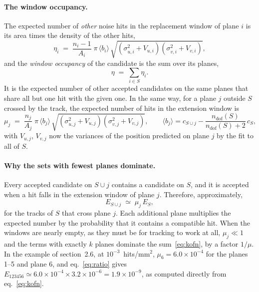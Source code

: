 \documentclass[a4paper,11pt]{article}
\newcommand{\ndof}{n_\mathrm{dof}}
\begin{document}
\paragraph{The window occupancy.} The expected number of \emph{other} noise hits in the
replacement window of plane $i$ is its area times the density of the other hits,
\begin{equation}
  \eta_i \;=\; \frac{n_i-1}{A_i}\;\pi\,\langle b_i\rangle\,
  \sqrt{(\sigma_{u,i}^2+V_{u,i})(\sigma_{v,i}^2+V_{v,i})} ,
  \label{eq:eta_i}
\end{equation}
and the \emph{window occupancy} of the candidate is the sum over its planes,
\begin{equation}
  \eta \;=\; \sum_{i\in S}\eta_i .
  \label{eq:eta}
\end{equation}
It is the expected number of other accepted candidates on the same planes that share all but
one hit with the given one. In the same way, for a plane $j$ outside $S$ crossed by the
track, the expected number of hits in the extension window is
\begin{equation}
  \mu_j \;=\; \frac{n_j}{A_j}\;\pi\,\langle b_j\rangle\,\sqrt{(\sigma_{u,j}^2+V_{u,j})(\sigma_{v,j}^2+V_{v,j})},
  \qquad \langle b_j\rangle = c_{S\cup j}-\frac{\ndof(S)}{\ndof(S)+2}\,c_S ,
  \label{eq:mu}
\end{equation}
with $V_{u,j}$, $V_{v,j}$ now the variances of the position predicted on plane $j$ by the fit to
all of $S$.

\paragraph{Why the sets with fewest planes dominate.} Every accepted candidate on $S\cup j$
contains a candidate on $S$, and it is accepted when a hit falls in the extension window of
plane $j$. Therefore, approximately,
\begin{equation}
  E_{S\cup j} \;\simeq\; \mu_j\,E_S ,
  \label{eq:ratio}
\end{equation}
for the tracks of $S$ that cross plane $j$. Each additional plane multiplies the expected number
by the probability that it contains a compatible hit. When the windows are nearly empty, as they
must be for tracking to work at all, $\mu_j\ll1$ and the terms with exactly $k$ planes dominate
the sum~\eqref{eq:kofn}, by a factor $1/\mu$. In the example of section~2.6, at
$10^{-3}$~hits/mm$^2$, $\mu_6=6.0\times10^{-4}$ for the planes 1--5 and plane 6, and
eq.~\eqref{eq:ratio} gives $E_{123456}\simeq 6.0\times10^{-4}\times3.2\times10^{-6}
=1.9\times10^{-9}$, as computed directly from eq.~\eqref{eq:kofn}.
\end{document}
